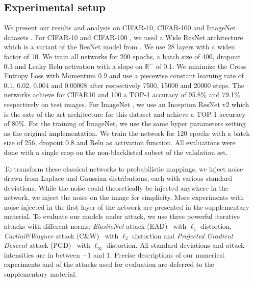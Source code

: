 \subsection{Experimental setup}

We present our results and analysis on  CIFAR-10, CIFAR-100 \cite{krizhevsky2009learning} and ImageNet datasets \cite{deng2009imagenet}.
For CIFAR-10 and CIFAR-100 \cite{krizhevsky2009learning}, we used a Wide ResNet architecture \cite{zagoruyko2016wide} which is a variant of the ResNet model from \cite{he2016deep}.
We use 28 layers with a widen factor of 10.
We train all networks for 200 epochs, a batch size of 400, dropout 0.3 and Leaky Relu activation with a slope on $\mathbb{R}^-$ of 0.1.
We minimize the Cross Entropy Loss with Momentum 0.9 and use a piecewise constant learning rate of 0.1, 0.02, 0.004 and 0.00008 after respectively 7500, 15000 and 20000 steps.
The networks achieve for CIFAR10 and 100 a TOP-1 accuracy of 95.8\% and 79.1\% respectively on test images.
For ImageNet \cite{deng2009imagenet}, we use an Inception ResNet v2 \cite{szegedy2017inception} which is the sate of the art architecture for this dataset and achieve a TOP-1 accuracy of 80\%.
For the training of ImageNet, we use the same hyper parameters setting as the original implementation.
We train the network for 120 epochs with a batch size of 256, dropout 0.8 and Relu as activation function.
All evaluations were done with a single crop on the non-blacklisted subset of the validation set.

To transform these classical networks to probabilistic mappings, we inject noise drawn from Laplace and Gaussian distributions, each with various standard deviations.
While the noise could theoretically be injected anywhere in the network, we inject the noise on the image for simplicity.
More experiments with noise injected in the first layer of the network are presented in the supplementary material.
To evaluate our models under attack, we use three powerful iterative attacks with different norms: \emph{ElasticNet} attack (EAD)~\cite{chen2018ead} with $\ell_1$ distortion, \emph{Carlini\&Wagner} attack (C\&W)~\cite{carlini2017towards} with $\ell_2$ distortion and \emph{Projected Gradient Descent} attack (PGD)~\cite{madry2018towards} with $\ell_\infty$ distortion.
All standard deviations and attack intensities are in between $-1$ and $1$.
Precise descriptions of our numerical experiments and of the attacks used for evaluation are deferred to the supplementary material.

